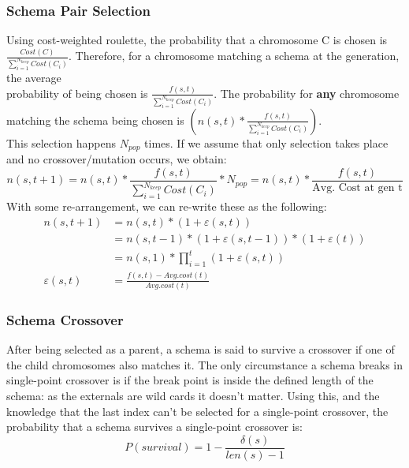\subsubsection{Schema Pair Selection}
Using cost-weighted roulette, the probability that a chromosome C is chosen is \(\frac{Cost(C)}{\sum_{i=1}^{N_{keep}} Cost(C_i)} \).
Therefore, for a chromosome matching a schema at the generation, the average \\probability of being chosen is  \(\frac{f(s,t)}{\sum_{i=1}^{N_{keep}} Cost(C_i)} \). The probability for \textbf{any} chromosome \\ matching the schema being chosen is \(\left(n(s,t) * \frac{f(s,t)}{\sum_{i=1}^{N_{keep}} Cost(C_i)} \right)\).\\
This selection happens $N_{pop}$ times. If we assume that only selection takes place and no crossover/mutation occurs, we obtain:
\begin{equation}
    n(s,t+1) = n(s,t) * \frac{f(s,t)}{\sum_{i=1}^{N_{keep}} Cost(C_i)} * N_{pop} = n(s,t) * \frac{f(s,t)}{\text{Avg. Cost at gen t}} 
\end{equation}
With some re-arrangement, we can re-write these as the following:
\begin{align}
    n(s,t+1) &= n(s,t) * (1 + \varepsilon(s,t)) \\
             &= n(s,t-1) * (1+\varepsilon(s,t-1)) * (1+\varepsilon(t)) \nonumber \\ 
             &= n(s,1) * \prod_{i=1}^{t}(1+\varepsilon(s,t)) \\
    \varepsilon(s,t) &= \frac{f(s,t)-Avg.cost(t)}{Avg.cost(t)} 
\end{align}

\subsubsection{Schema Crossover}
After being selected as a parent, a schema is said to survive a crossover if one of the child chromosomes also matches it. The only circumstance a schema breaks in single-point crossover is if the break point is inside the defined length of the schema: as the externals are wild cards it doesn't matter. Using this, and the knowledge that the last index can't be selected for a single-point crossover, the probability that a schema survives a single-point crossover is: 
\begin{equation}
    P(survival) = 1- \frac{\delta(s)}{len(s)-1}
\end{equation}

